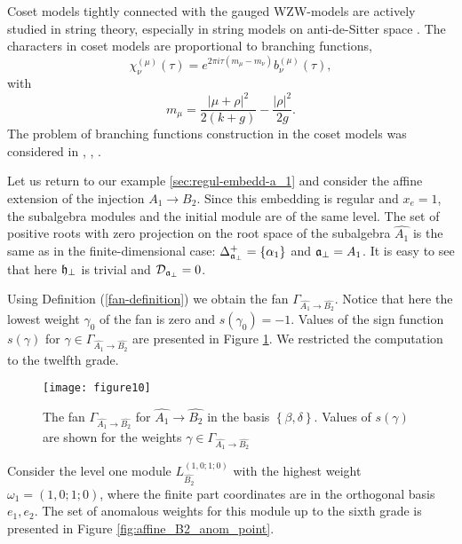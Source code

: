 Coset models \cite{Goddard198588} tightly connected with the gauged WZW-models are actively studied
in string theory, especially in string models on anti-de-Sitter space
\cite{Maldacena:2000hw,Maldacena:2000kv,Maldacena:2001km,Maldacena:2001ky,Aharony:1999ti}.
The characters in coset models are proportional to branching functions,
\begin{equation}
  \label{eq:31}
  \chi^{(\mu)}_{\nu}(\tau)=e^{2\pi i \tau (m_{\mu}-m_{\nu})} b^{(\mu)}_{\nu}(\tau),
\end{equation}
with
\begin{equation*}
  \label{eq:46}
  m_{\mu}=\frac{\left|\mu+\rho\right|^2}{2(k+g)}-\frac{\left|\rho\right|^2}{2g}.
\end{equation*}
The problem of branching functions construction in the coset models was considered
in  \cite{Dunbar:1992gh}, \cite{Hwang:1994yr}, \cite{lu1994branching}.

Let us return to our example \ref{sec:regul-embedd-a_1} and consider the affine extension of the injection
$A_1 \rightarrow B_2$.
Since this embedding is regular and $x_e=1$, the subalgebra modules and the initial module are of the same level.
The set  of positive roots with zero projection
on the root space of the subalgebra $\hat{A_1}$ is the same as in the finite-dimensional case:
$\Delta^{+}_{\mathfrak{a}_{\bot}}=\left\{ \alpha_1 \right\}$ and $\mathfrak{a}_{\bot}=A_1$. It is easy to see that here $\mathfrak{h}_{\perp}$
is trivial and ${\cal D}_{\mathfrak{a}_{\bot}}=0$.

Using Definition (\ref{fan-definition}) we obtain the fan
$\Gamma_{\hat{A_1} \longrightarrow  \hat{B_2} }$.
Notice that here the lowest weight  $\gamma_0$ of the fan  is zero and $s\left( \gamma_0 \right)=-1$.
Values of the sign function $s(\gamma)$ for
$ \gamma \in \Gamma_{\hat{A_1} \longrightarrow  \hat{B_2} }$ are presented in Figure \ref{fig:AffineB2A1Fan}.
We restricted the computation to the twelfth grade.
\begin{figure}[h!bt]
  \centering
  \texttt{[image: figure10]}
  \caption{The fan $\Gamma_{\hat{A_1}\rightarrow \hat{B_2}}$
  for $\hat{A_1}\rightarrow \hat{B_2}$ in the basis $\left\{\beta,\delta \right\}$. Values of  $s(\gamma)$ are shown for the
  weights $\gamma\in \Gamma_{\hat{A_1}\rightarrow \hat{B_2}}$}
  \label{fig:AffineB2A1Fan}
\end{figure}


Consider the level one module $L^{\left( 1,0;1;0 \right)}_{\hat{B_2}}$  with the highest weight $\omega_1=(1,0;1;0)$,
where the finite part coordinates are in the orthogonal basis $e_1,e_2$.
The set of anomalous weights for this module up to the sixth grade is presented in Figure \ref{fig:affine_B2_anom_point}.

